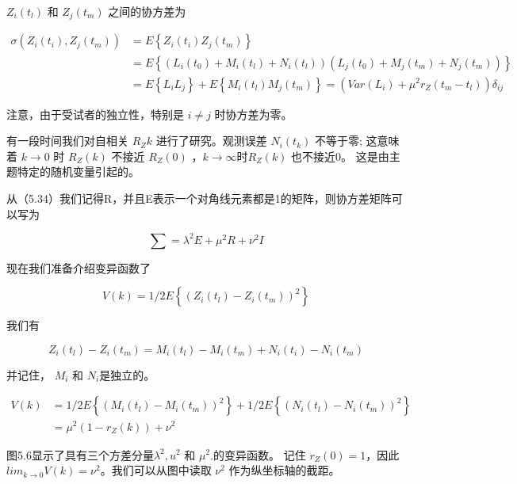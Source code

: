 $ Z_{i}(t_{l}) $ 和  $ Z_{j}(t_{m}) $ 之间的协方差为


\begin{equation*}
\begin{aligned}
\sigma (Z_{i}(t_{i}), Z_{j}(t_{m}))&=E\left\lbrace Z_{i}(t_{i}) Z_{j}(t_{m})\right\rbrace\\
&=E\left\lbrace(L_{i}(t_{0})+M_{i}(t_{l})+N_{i}(t_{l}))(L_{j}(t_{0})+M_{j}(t_{m})+N_{j}(t_{m}))  \right\rbrace\\
&= E\left\lbrace L_{i}L_{j}\right\rbrace +E\left\lbrace M_{i}(t_{l})M_{j}(t_{m}) \right\rbrace =(Var(L_{i})+\mu^{2}r_{Z}(t_{m}-t_{l}))\delta_{ij}
\end{aligned}
\end{equation*}

注意，由于受试者的独立性，特别是 $ i\neq j $ 时协方差为零。

有一段时间我们对自相关 $ R_{Z}{k} $ 进行了研究。观测误差 $ N_{i}(t_{k}) $ 不等于零; 这意味着  $ k\rightarrow 0 $ 时 $ R_{Z}(k) $ 不接近 $ R_{Z}(0) $ ，$ k\rightarrow \infty $时$ R_{Z}(k) $ 也不接近0。 这是由主题特定的随机变量引起的。


从（5.34）我们记得R，并且E表示一个对角线元素都是1的矩阵，则协方差矩阵可以写为

 \[ \sum = \lambda^{2}E+\mu^{2}R+\nu^{2}I \]
 
 现在我们准备介绍变异函数了
 
 
 \begin{equation}\label{5.37}
V(k) = 1/2E\left\lbrace (Z_{i}(t_{l})-Z_{i}(t_{m}))^{2} \right\rbrace
\end{equation}

 
 我们有
 
  \[ Z_{i}(t_{l})-Z_{i}(t_{m})=M_{i}(t_{l})-M_{i}(t_{m})+N_{i}(t_{i})-N_{i}(t_{m})\]
  
  并记住， $ M_{i} $ 和 $ N_{i} $是独立的。
  
 \begin{equation*}
 \begin{aligned}
 V(k)&=1/2E\left\lbrace (M_{i}(t_{l})-M_{i}(t_{m}))^{2}\right\rbrace+1/2E\left\lbrace (N_{i}(t_{l})-N_{i}(t_{m}))^{2}\right\rbrace\\
 &=\mu^{2}(1-r_{Z}(k))+\nu^{2} 
 \end{aligned}
 \end{equation*}
  

图5.6显示了具有三个方差分量$ \lambda^{2},u^{2} $ 和 $ \mu^{2} $.的变异函数。 记住 $ r_{Z}(0)=1 $，因此 $ lim_{k\rightarrow 0}V(k)=\nu^{2} $。我们可以从图中读取 $ \nu^{2} $ 作为纵坐标轴的截距。

